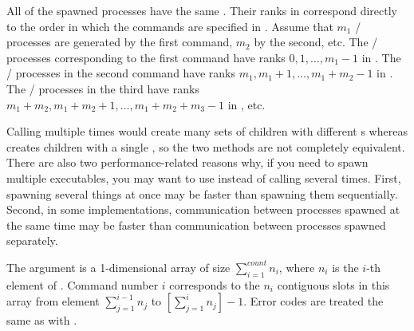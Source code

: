 All of the spawned processes have the same
. Their ranks in 
correspond directly to the order in which the commands are
specified in . Assume
that $m_1$ \MPI/ processes are generated by the first command, $m_2$ by
the second, etc.
The \MPI/ processes
corresponding to the first command have ranks $0, 1, \ldots,
m_1-1$ in . The \MPI/ processes in the second command have ranks
$m_1, m_1+1, \ldots, m_1+m_2-1$ in . The \MPI/ processes in the third
have ranks $m_1+m_2, m_1+m_2+1, \ldots, m_1+m_2+m_3-1$ in , etc.

\begin{users}
Calling  multiple times
would create many sets of children with different s
whereas  creates children with
a single , so the two methods
are not completely equivalent.
There are also two performance-related reasons why,
if you need to spawn multiple executables, you may want to  use
 instead of calling 
several times. First, spawning several
things at once may be faster than spawning them sequentially. Second,
in some implementations,
communication between processes spawned at the same time may be
faster than communication between processes spawned separately.
\end{users}

The  argument is
a
1-dimensional array of size $\sum_{i=1}^{count} n_i$,
where $n_i$ is the
$i$-th
element of .
Command number $i$ corresponds to the $n_i$ contiguous
slots in this array from element $\sum_{j=1}^{i-1} n_j$
to $\left[\sum_{j=1}^{i} n_j\right] - 1$.
Error codes are treated
the same as with .


